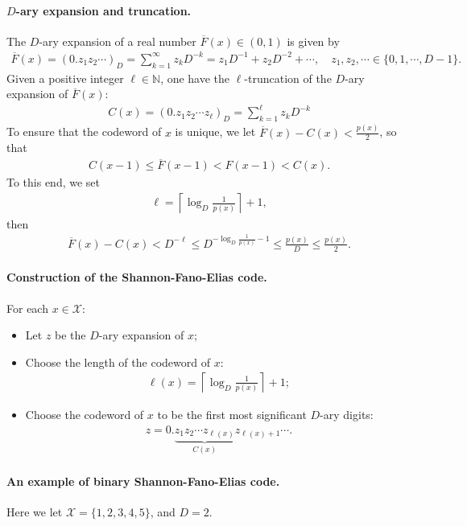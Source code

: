 \documentclass{article}
\numberwithin{equation}{section}
\newcommand{\bbN}{\mathbb{N}}
\renewcommand{\cal}{\mathcal}
\newcommand{\ol}{\overline}
\theoremstyle{plain}
\theoremstyle{definition}
\begin{document}
\paragraph{$D$-ary expansion and truncation.} The $D$-ary expansion of a real number $\ol{F}(x)\in(0,1)$ is given by
\begin{align*}
	\ol{F}(x)=(0.z_1z_2\cdots)_D=\sum_{k=1}^\infty z_kD^{-k}=z_1D^{-1}+z_2D^{-2}+\cdots,\quad z_1,z_2,\cdots\in\{0,1,\cdots,D-1\}.
\end{align*}
Given a positive integer $\ell\in\bbN$, one have the $\ell$-truncation of the $D$-ary expansion of $\ol{F}(x)$:
\begin{align*}
	C(x)=(0.z_1z_2\cdots z_\ell)_D=\sum_{k=1}^\ell z_kD^{-k}
\end{align*}
To ensure that the codeword of $x$ is unique, we let $\ol{F}(x)-C(x)<\frac{p(x)}{2}$, so that
\begin{align*}
	C(x-1)\leq\ol{F}(x-1)<F(x-1)< C(x).
\end{align*}
To this end, we set
\begin{align*}
	\ell=\left\lceil\log_D\frac{1}{p(x)}\right\rceil+1,
\end{align*}
then
\begin{align*}
	\ol{F}(x)-C(x) < D^{-\ell} \leq D^{-\log_D\frac{1}{p(x)}-1}\leq\frac{p(x)}{D}\leq\frac{p(x)}{2}.
\end{align*}

\paragraph{Construction of the Shannon-Fano-Elias code.} For each $x\in\cal{X}$:
\begin{itemize}
\item Let $z$ be the $D$-ary expansion of $x$;
\item Choose the length of the codeword of $x$:
\begin{align*}
\ell(x)=\left\lceil\log_D\frac{1}{p(x)}\right\rceil+1;
\end{align*}
\item Choose the codeword of $x$ to be the first most significant $D$-ary digits:
\begin{align*}
	z=0.\underbrace{z_1z_2\cdots z_{\ell(x)}}_{C(x)}z_{\ell(x)+1}\cdots.
\end{align*}
\end{itemize}

\paragraph{An example of binary Shannon-Fano-Elias code.} Here we let $\cal{X}=\{1,2,3,4,5\}$, and $D=2$.
\end{document}
